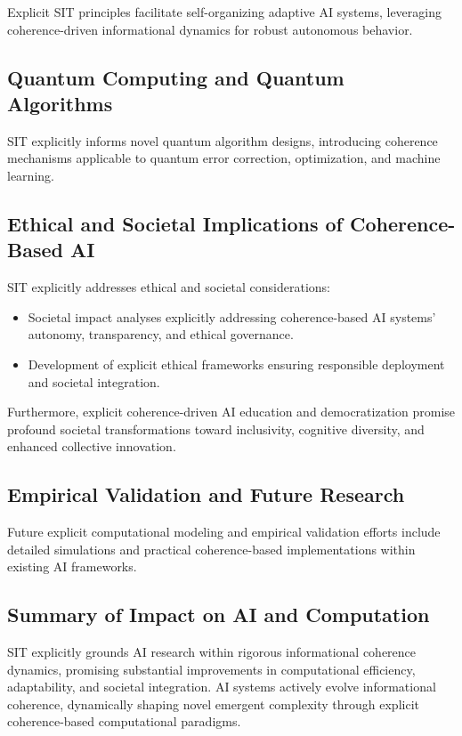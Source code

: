 Explicit SIT principles facilitate self-organizing adaptive AI systems, leveraging coherence-driven informational dynamics for robust autonomous behavior.

\subsection{Quantum Computing and Quantum Algorithms}

SIT explicitly informs novel quantum algorithm designs, introducing coherence mechanisms applicable to quantum error correction, optimization, and machine learning.

\subsection{Ethical and Societal Implications of Coherence-Based AI}

SIT explicitly addresses ethical and societal considerations:

\begin{itemize}
\item Societal impact analyses explicitly addressing coherence-based AI systems' autonomy, transparency, and ethical governance.
\item Development of explicit ethical frameworks ensuring responsible deployment and societal integration.
\end{itemize}

Furthermore, explicit coherence-driven AI education and democratization promise profound societal transformations toward inclusivity, cognitive diversity, and enhanced collective innovation.

\subsection{Empirical Validation and Future Research}

Future explicit computational modeling and empirical validation efforts include detailed simulations and practical coherence-based implementations within existing AI frameworks.

\subsection{Summary of Impact on AI and Computation}

SIT explicitly grounds AI research within rigorous informational coherence dynamics, promising substantial improvements in computational efficiency, adaptability, and societal integration. AI systems actively evolve informational coherence, dynamically shaping novel emergent complexity through explicit coherence-based computational paradigms.



